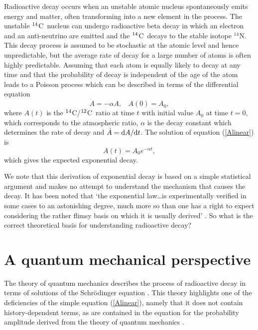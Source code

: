 \documentclass[12pt]{article}
\renewcommand{\Ref}[1]{(\ref{#1})}
\newcommand{\cft}{$^{\rm 14}$C}
\newcommand{\ctw}{$^{\rm 12}$C}
\newcommand{\upd}{{\rm d}}
\begin{document}
Radioactive decay occurs when an unstable atomic nucleus spontaneously
emits energy and matter, often transforming into a new
element in the process. The unstable \cft~nucleus can undergo radioactive 
beta decay
in which an electron and an anti-neutrino are emitted and the \cft~decays
to the stable isotope $^{14}$N. This decay process is assumed to be 
stochastic at the atomic level and hence unpredictable, but the average 
rate of decay for a large number of atoms is often highly predictable. 
Assuming that each atom is equally likely to decay at any time and that the
probability of decay is independent of the age of the atom leads to 
a Poisson process \cite{evans67} which can be described in terms of the 
differential equation
\begin{equation}\label{Alinear}
\dot A=-\alpha A,~~~~A(0)=A_0,
\end{equation}
where $A(t)$ is the \cft/\ctw~ratio at time $t$ with initial value $A_0$
at time $t=0$, which corresponds to the atmospheric ratio,
$\alpha$ is the decay constant which determines the rate of 
decay and $\dot A=\upd A/\upd t$. The solution of equation \Ref{Alinear} is 
$$A(t)=A_0e^{-\alpha t},$$
which gives the expected exponential decay. 

We note that this derivation of exponential decay is based on a simple
statistical argument and
makes no attempt to understand the mechanism that causes the decay. It has
been noted that `the exponential law\ldots is experimentally
verified in some cases to an astonishing degree, much more so than one has
a right to expect considering the rather flimsy basis on which it is
usually derived' \cite[p594]{newton66}. So what is the correct theoretical
basis for understanding radioactive decay?

\section{A quantum mechanical perspective}
\label{quantum-mechanics}

The theory of quantum mechanics describes the process of radioactive 
decay in terms of solutions of the Schr\"odinger equation
\cite{fonda78,merzbacher98}. This theory highlights one of 
the deficiencies of the simple equation \Ref{Alinear},
namely that it does not contain history-dependent terms, as are contained
in the equation for the probability amplitude derived from the theory of 
quantum mechanics \cite{fonda78,peres80}. 
\end{document}
